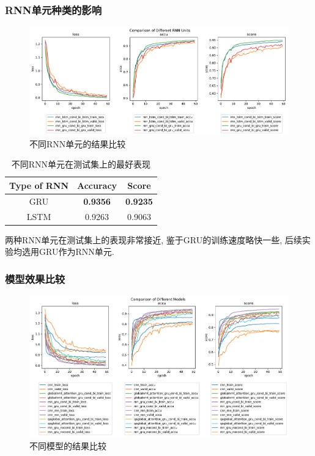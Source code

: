 \documentclass[a4paper]{article}
\begin{document}
	\subsubsection{RNN单元种类的影响}
	\begin{figure}[H]
		\centering
		\includegraphics[width=\textwidth]{comparison_of_different_rnn_units.pdf}
		\caption{不同RNN单元的结果比较}
		\label{comparison_of_different_rnn_units}
	\end{figure}
	\begin{table}[H]
		\centering
		\caption{不同RNN单元在测试集上的最好表现}
		\label{rnnunitperf}
		\begin{tabular}{@{}ccc@{}}
			\toprule
			\textbf{Type of RNN}                  & \textbf{Accuracy} & \textbf{Score}  \\ \midrule
			GRU   & \textbf{0.9356}            & \textbf{0.9235}          \\
			LSTM                 & 0.9263            & 0.9063          \\ \bottomrule
		\end{tabular}
	\end{table}
	两种RNN单元在测试集上的表现非常接近, 鉴于GRU的训练速度略快一些, 后续实验均选用GRU作为RNN单元.
	\subsubsection{模型效果比较}
	\begin{figure}[H]
		\centering
		\includegraphics[width=\textwidth]{comparison_of_different_models.pdf}
		\caption{不同模型的结果比较}
		\label{comparison_of_different_models}
	\end{figure}
\end{document}
